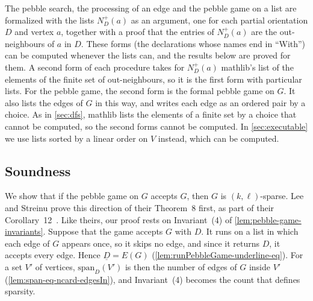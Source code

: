 \begin{fmlnote}
  \label{fmlnote:pebble-game-computable-core}
  The pebble search, the processing of an edge and the pebble game on
  a list are formalized with the lists $N^+_D(a)$ as an argument, one
  for each partial orientation $D$ and vertex $a$, together with a
  proof that the entries of $N^+_D(a)$ are the out-neighbours of $a$
  in $D$. These forms (the declarations whose names end in ``With'')
  can be computed whenever the lists can, and the results below are
  proved for them. A second form of each procedure takes for
  $N^+_D(a)$ mathlib's list of the elements of the finite set of
  out-neighbours, so it is the first form with particular lists. For
  the pebble game, the second form is the formal pebble game on $G$. It
  also lists the edges of $G$ in this way, and writes each edge as an
  ordered pair by a choice. As in \cref{sec:dfs},
  mathlib lists the elements of a finite set by a choice that cannot be
  computed, so the second forms cannot be computed. In
  \cref{sec:executable} we use lists sorted by a linear order on $V$
  instead, which can be computed.
\end{fmlnote}

\subsection{Soundness}
\label{sec:pebble-game-soundness}

We show that if the pebble game on $G$ accepts $G$, then $G$ is
$(k, \ell)$-sparse. Lee and Streinu prove this direction of their
Theorem~8 first, as part of their
Corollary~12~\cite{leeStreinu2008}. Like theirs, our proof rests on
Invariant~(4) of \cref{lem:pebble-game-invariants}. Suppose that the
game accepts $G$ with $D$. It runs on a list in which each edge of $G$
appears once, so it skips no edge, and since it returns $D$, it accepts
every edge. Hence $\underline{D} = E(G)$
(\cref{lem:runPebbleGame-underline-eq}). For a set $V'$ of vertices,
$\mathrm{span}_D(V')$ is then the number of edges of $G$ inside $V'$
(\cref{lem:span-eq-ncard-edgesIn}), and Invariant~(4) becomes the count
that defines sparsity.

